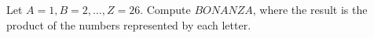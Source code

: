 Let $A=1,B=2,\ldots,Z=26$. Compute $BONANZA$, where the result is the product of the numbers represented by each letter.